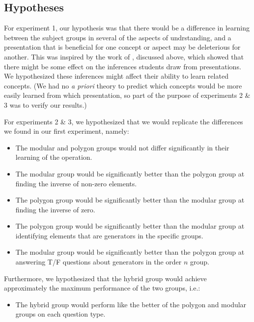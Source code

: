 \documentclass[man,10pt]{apa6}
\begin{document}
\subsection{Hypotheses}
For experiment 1, our hypothesis was that there would be a difference in learning between the subject groups in several of the aspects of undrstanding, and a presentation that is beneficial for one concept or aspect may be deleterious for another. This was inspired by the work of \cite{DeBock2011}, discussed above, which showed that there might be some effect on the inferences students draw from presentations. We hypothesized these inferences might affect their ability to learn related concepts. (We had no \emph{a priori} theory to predict which concepts would be more easily learned from which presentation, so part of the purpose of experiments 2 \& 3 was to verify our results.)\par
For experiments 2 \& 3, we hypothesized that we would replicate the differences we found in our first experiment, namely: 
\begin{itemize} 
\item The modular and polygon groups would not differ significantly in their learning of the operation.
\item The modular group would be significantly better than the polygon group at finding the inverse of non-zero elements.
\item The polygon group would be significantly better than the modular group at finding the inverse of zero.
\item The polygon group would be significantly better than the modular group at identifying elements that are generators in the specific groups.
\item The modular group would be significantly better than the polygon group at answering T/F questions about generators in the order $n$ group.
\end{itemize}
Furthermore, we hypothesized that the hybrid group would achieve approximately the maximum performance of the two groups, i.e.:
\begin{itemize}
\item The hybrid group would perform like the better of the polygon and modular groups on each question type. 
\end{itemize}
\end{document}
